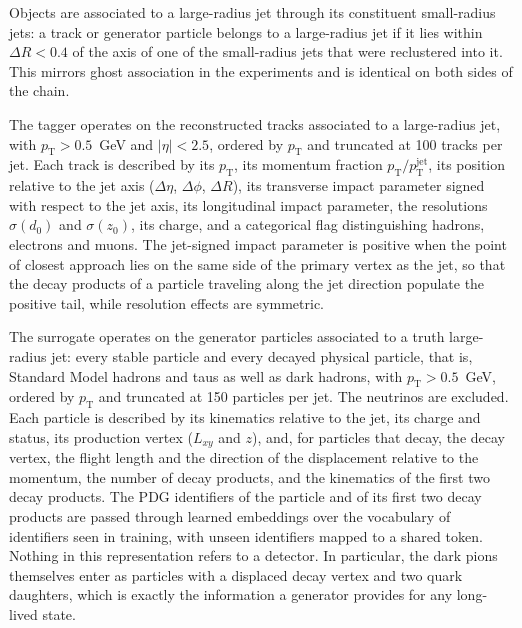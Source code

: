 \documentclass[a4paper,11pt]{article}
\newcommand{\dnought}{d_0}
\newcommand{\znought}{z_0}
\newcommand{\dR}{\Delta R}
\newcommand{\pT}{p_{\mathrm{T}}}
\newcommand{\obshead}[1]{\par\medskip\noindent{\bfseries #1}\par\nobreak\smallskip}
\begin{document}
Objects are associated to a large-radius jet through its constituent
small-radius jets: a track or generator particle belongs to a
large-radius jet if it lies within $\dR < 0.4$ of the axis of one of
the small-radius jets that were reclustered into it. This mirrors
ghost association in the experiments and is identical on both sides of
the chain.

\obshead{Detector-level inputs}

The tagger operates on the reconstructed tracks associated to a
large-radius jet, with $\pT > 0.5$~GeV and $|\eta| < 2.5$, ordered by
$\pT$ and truncated at 100 tracks per jet. Each track is described by
its $\pT$, its momentum fraction $\pT/\pT^{\mathrm{jet}}$, its position
relative to the jet axis ($\Delta\eta$, $\Delta\phi$, $\dR$), its
transverse impact parameter signed with respect to the jet axis, its
longitudinal impact parameter, the resolutions $\sigma(\dnought)$ and
$\sigma(\znought)$, its charge, and a categorical flag distinguishing
hadrons, electrons and muons. The jet-signed impact parameter is
positive when the point of closest approach lies on the same side of
the primary vertex as the jet, so that the decay products of a
particle traveling along the jet direction populate the positive tail,
while resolution effects are symmetric.

\obshead{Truth-level inputs}

The surrogate operates on the generator particles associated to a
truth large-radius jet: every stable particle and every decayed
physical particle, that is, Standard Model hadrons and taus as well as
dark hadrons, with $\pT > 0.5$~GeV, ordered by $\pT$ and truncated at
150 particles per jet. The neutrinos are excluded. Each particle is
described by its kinematics relative to the jet, its charge and
status, its production vertex ($L_{xy}$ and $z$), and, for particles
that decay, the decay vertex, the flight length and the direction of
the displacement relative to the momentum, the number of decay
products, and the kinematics of the first two decay products. The PDG
identifiers of the particle and of its first two decay products are
passed through learned embeddings over the vocabulary of identifiers
seen in training, with unseen identifiers mapped to a shared token.
Nothing in this representation refers to a detector. In particular, the
dark pions themselves enter as particles with a displaced decay vertex
and two quark daughters, which is exactly the information a generator
provides for any long-lived state.
\end{document}
